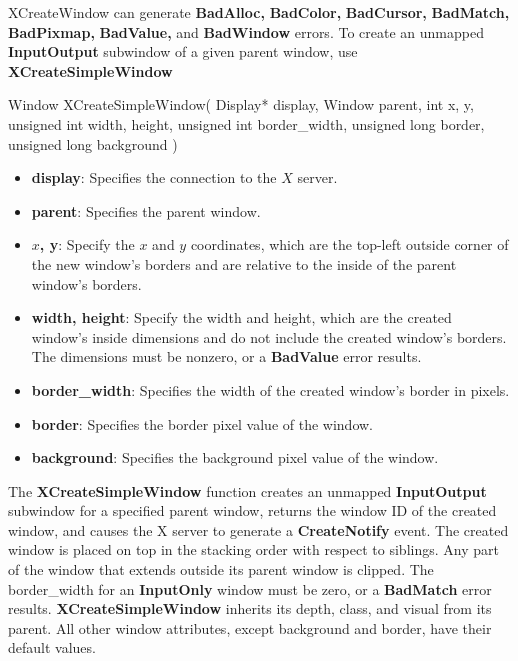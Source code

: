 \documentclass{report}
\begin{document}
\begin{itemize}
            \bigbreak \noindent 
            XCreateWindow can generate \textbf{BadAlloc,} \textbf{BadColor,} \textbf{BadCursor,} \textbf{BadMatch,} \textbf{BadPixmap,} \textbf{BadValue,} and \textbf{BadWindow} errors.
            \bigbreak \noindent 
            To create an unmapped \textbf{InputOutput} subwindow of a given parent window, use \textbf{XCreateSimpleWindow}
            \bigbreak \noindent 
            \begin{cppcode}
                Window XCreateSimpleWindow(
                    Display* display,
                    Window parent, 
                    int x, y,
                    unsigned int width, height,
                    unsigned int border_width,
                    unsigned long border,
                    unsigned long background
                )
            \end{cppcode}
            \bigbreak \noindent
            \begin{itemize}
                \item \textbf{display}: Specifies the connection to the $X$ server.
                \item \textbf{parent}: Specifies the parent window.
                \item \textbf{$x$, y}: Specify the $x$ and $y$ coordinates, which are the top-left outside corner of the new window’s borders and are relative to the inside of the parent window’s borders.
                \item \textbf{width, height}: Specify the width and height, which are the created window’s inside dimensions and do not include the created window’s borders. The dimensions must be nonzero, or a \textbf{BadValue} error results.
                \item \textbf{border\_width}: Specifies the width of the created window’s border in pixels.
                \item \textbf{border}: Specifies the border pixel value of the window.
                \item \textbf{background}: Specifies the background pixel value of the window.
            \end{itemize}
            \bigbreak \noindent 
            The \textbf{XCreateSimpleWindow} function creates an unmapped \textbf{InputOutput} subwindow for a specified parent window, returns the window ID of the created window, and causes the X server to generate a \textbf{CreateNotify} event. The created window is placed on top in the stacking order with respect to siblings. Any part of the window that extends outside its parent window is clipped. The border\_width for an \textbf{InputOnly} window must be zero, or a \textbf{BadMatch} error results. \textbf{XCreateSimpleWindow} inherits its depth, class, and visual from its parent. All other window attributes, except background and border, have their default values.

\end{itemize}
\end{document}
